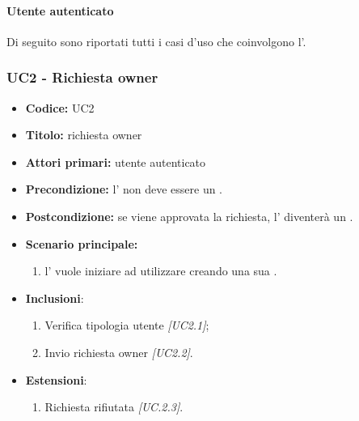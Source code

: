 \documentclass[casi-duso]{subfiles}
\begin{document}
\paragraph{Utente autenticato}
\label{par:utente-autenticato}
Di seguito sono riportati tutti i casi d'uso che coinvolgono l'.

\subsubsection{UC2 - Richiesta owner}
\label{subsub:UC2}
\begin{itemize}
  \item \textbf{Codice:} UC2
  \item \textbf{Titolo:} richiesta owner
  \item \textbf{Attori primari:} utente autenticato
  \item \textbf{Precondizione:} l' non deve essere un .
  \item \textbf{Postcondizione:} se viene approvata la richiesta, l' diventerà un .
  \item \textbf{Scenario principale:} 
  \begin{enumerate}
    \item l' vuole iniziare ad utilizzare  creando una sua .
  \end{enumerate}
  \item \textbf{Inclusioni}:
  \begin{enumerate}
    \item Verifica tipologia utente \emph{[UC2.1]};
    \item Invio richiesta owner \emph{[UC2.2]}.
  \end{enumerate}
  \item \textbf{Estensioni}:
  \begin{enumerate}
    \item Richiesta rifiutata \emph{[UC.2.3]}.
  \end{enumerate}
\end{itemize}
\end{document}
